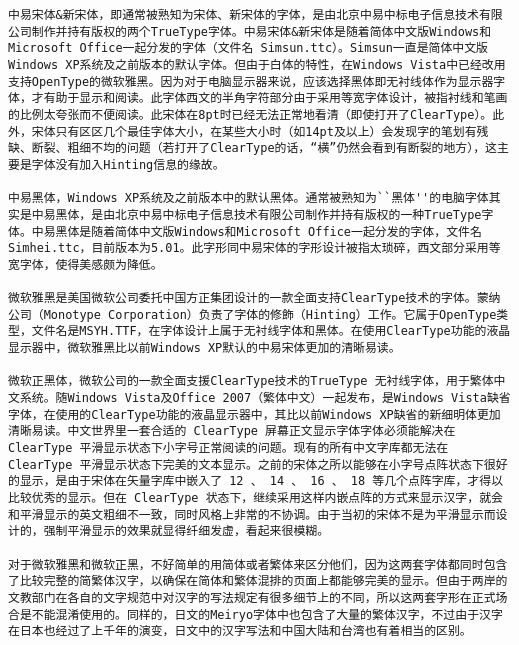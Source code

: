 \begin{verbatim}
中易宋体&新宋体，即通常被熟知为宋体、新宋体的字体，是由北京中易中标电子信息技术有限公司制作并持有版权的两个TrueType字体。中易宋体&新宋体是随着简体中文版Windows和Microsoft Office一起分发的字体（文件名 Simsun.ttc）。Simsun一直是简体中文版Windows XP系统及之前版本的默认字体。但由于白体的特性，在Windows Vista中已经改用支持OpenType的微软雅黑。因为对于电脑显示器来说，应该选择黑体即无衬线体作为显示器字体，才有助于显示和阅读。此字体西文的半角字符部分由于采用等宽字体设计，被指衬线和笔画的比例太夸张而不便阅读。此宋体在8pt时已经无法正常地看清（即使打开了ClearType）。此外，宋体只有区区几个最佳字体大小，在某些大小时（如14pt及以上）会发现字的笔划有残缺、断裂、粗细不均的问题（若打开了ClearType的话，“横”仍然会看到有断裂的地方），这主要是字体没有加入Hinting信息的缘故。

中易黑体，Windows XP系统及之前版本中的默认黑体。通常被熟知为``黑体''的电脑字体其实是中易黑体，是由北京中易中标电子信息技术有限公司制作并持有版权的一种TrueType字体。中易黑体是随着简体中文版Windows和Microsoft Office一起分发的字体，文件名Simhei.ttc，目前版本为5.01。此字形同中易宋体的字形设计被指太琐碎，西文部分采用等宽字体，使得美感颇为降低。

微软雅黑是美国微软公司委托中国方正集团设计的一款全面支持ClearType技术的字体。蒙纳公司（Monotype Corporation）负责了字体的修飾（Hinting）工作。它属于OpenType类型，文件名是MSYH.TTF，在字体设计上属于无衬线字体和黑体。在使用ClearType功能的液晶显示器中，微软雅黑比以前Windows XP默认的中易宋体更加的清晰易读。

微软正黑体，微软公司的一款全面支援ClearType技术的TrueType 无衬线字体，用于繁体中文系统。随Windows Vista及Office 2007（繁体中文）一起发布，是Windows Vista缺省字体，在使用的ClearType功能的液晶显示器中，其比以前Windows XP缺省的新细明体更加清晰易读。中文世界里一套合适的 ClearType 屏幕正文显示字体字体必须能解决在 ClearType 平滑显示状态下小字号正常阅读的问题。现有的所有中文字库都无法在 ClearType 平滑显示状态下完美的文本显示。之前的宋体之所以能够在小字号点阵状态下很好的显示，是由于宋体在矢量字库中嵌入了 12 、 14 、 16 、 18 等几个点阵字库，才得以比较优秀的显示。但在 ClearType 状态下，继续采用这样内嵌点阵的方式来显示汉字，就会和平滑显示的英文粗细不一致，同时风格上非常的不协调。由于当初的宋体不是为平滑显示而设计的，强制平滑显示的效果就显得纤细发虚，看起来很模糊。

对于微软雅黑和微软正黑，不好简单的用简体或者繁体来区分他们，因为这两套字体都同时包含了比较完整的简繁体汉字，以确保在简体和繁体混排的页面上都能够完美的显示。但由于两岸的文教部门在各自的文字规范中对汉字的写法规定有很多细节上的不同，所以这两套字形在正式场合是不能混淆使用的。同样的，日文的Meiryo字体中也包含了大量的繁体汉字，不过由于汉字在日本也经过了上千年的演变，日文中的汉字写法和中国大陆和台湾也有着相当的区别。


\end{verbatim}
